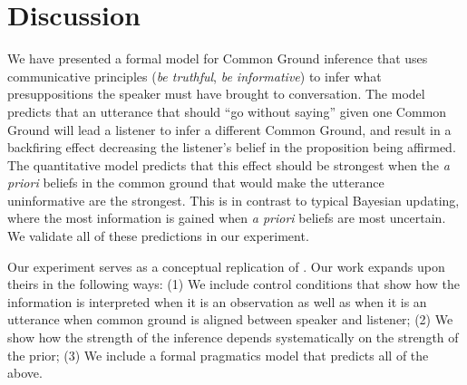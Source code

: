 \documentclass[10pt,letterpaper]{article}
\newcommand{\red}[1]{\textcolor{Red}{#1}}
\begin{document}


\section{Discussion}

We have presented a formal model for Common Ground inference that uses communicative principles (\emph{be truthful}, \emph{be informative}) to infer what presuppositions the speaker must have brought to conversation. 
The model predicts that an utterance that should ``go without saying'' given one Common Ground will lead a listener to infer a different Common Ground, and result in a backfiring effect decreasing the listener's belief in the proposition being affirmed.
The quantitative model predicts that this effect should be strongest when the \emph{a priori} beliefs in the common ground that would make the utterance uninformative are the strongest.
This is in contrast to typical Bayesian updating, where the most information is gained when \emph{a priori} beliefs are most uncertain. 
We validate all of these predictions in our experiment.


Our experiment serves as a conceptual replication of .
Our work expands upon theirs in the following ways: 
(1) We include control conditions that show how the information is interpreted when it is an observation as well as when it is an utterance when common ground is aligned between speaker and listener; 
(2) We show how the strength of the inference depends systematically on the strength of the prior;
(3) We include a formal pragmatics model that predicts all of the above.

\end{document}
